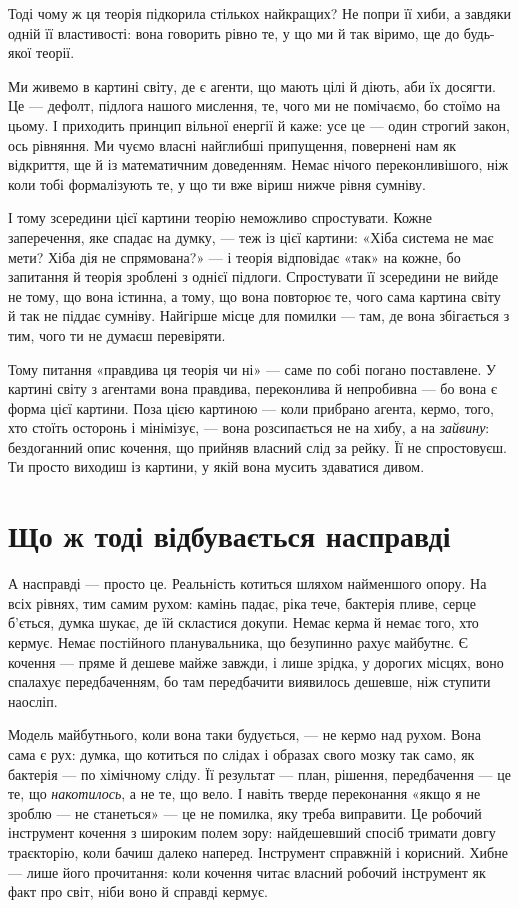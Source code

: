 \documentclass[12pt, a4paper, openany]{book}
\begin{document}
Тоді чому ж ця теорія підкорила стількох найкращих? Не попри її хиби, а завдяки одній її властивості: вона говорить рівно те, у що ми й так віримо, ще до будь-якої теорії.

Ми живемо в картині світу, де є агенти, що мають цілі й діють, аби їх досягти. Це --- дефолт, підлога нашого мислення, те, чого ми не помічаємо, бо стоїмо на цьому. І приходить принцип вільної енергії й каже: усе це --- один строгий закон, ось рівняння. Ми чуємо власні найглибші припущення, повернені нам як відкриття, ще й із математичним доведенням. Немає нічого переконливішого, ніж коли тобі формалізують те, у що ти вже віриш нижче рівня сумніву.

І тому зсередини цієї картини теорію неможливо спростувати. Кожне заперечення, яке спадає на думку, --- теж із цієї картини: «Хіба система не має мети? Хіба дія не спрямована?» --- і теорія відповідає «так» на кожне, бо запитання й теорія зроблені з однієї підлоги. Спростувати її зсередини не вийде не тому, що вона істинна, а тому, що вона повторює те, чого сама картина світу й так не піддає сумніву. Найгірше місце для помилки --- там, де вона збігається з тим, чого ти не думаєш перевіряти.

Тому питання «правдива ця теорія чи ні» --- саме по собі погано поставлене. У картині світу з агентами вона правдива, переконлива й непробивна --- бо вона є форма цієї картини. Поза цією картиною --- коли прибрано агента, кермо, того, хто стоїть осторонь і мінімізує, --- вона розсипається не на хибу, а на \emph{зайвину}: бездоганний опис кочення, що прийняв власний слід за рейку. Її не спростовуєш. Ти просто виходиш із картини, у якій вона мусить здаватися дивом.

\section{Що ж тоді відбувається насправді}

А насправді --- просто це. Реальність котиться шляхом найменшого опору. На всіх рівнях, тим самим рухом: камінь падає, ріка тече, бактерія пливе, серце б'ється, думка шукає, де їй скластися докупи. Немає керма й немає того, хто кермує. Немає постійного планувальника, що безупинно рахує майбутнє. Є кочення --- пряме й дешеве майже завжди, і лише зрідка, у дорогих місцях, воно спалахує передбаченням, бо там передбачити виявилось дешевше, ніж ступити наосліп.

Модель майбутнього, коли вона таки будується, --- не кермо над рухом. Вона сама є рух: думка, що котиться по слідах і образах свого мозку так само, як бактерія --- по хімічному сліду. Її результат --- план, рішення, передбачення --- це те, що \emph{накотилось}, а не те, що вело. І навіть тверде переконання «якщо я не зроблю --- не станеться» --- це не помилка, яку треба виправити. Це робочий інструмент кочення з широким полем зору: найдешевший спосіб тримати довгу траєкторію, коли бачиш далеко наперед. Інструмент справжній і корисний. Хибне --- лише його прочитання: коли кочення читає власний робочий інструмент як факт про світ, ніби воно й справді кермує.
\end{document}
